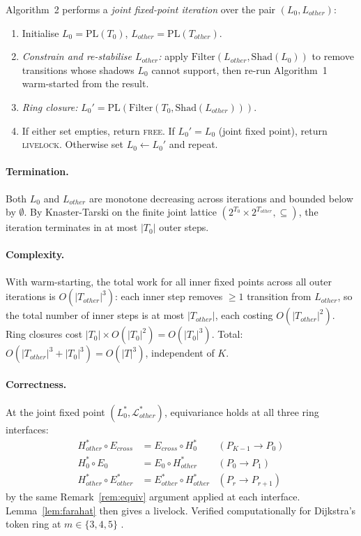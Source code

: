 \documentclass{article}
\newcommand{\Ls}{\mathcal{L}^{*}}
\newcommand{\PL}{\mathrm{PL}}
\newcommand{\Shad}{\mathrm{Shad}}
\newcommand{\Filter}{\mathrm{Filter}}
\newcommand{\Estar}{E^{*}}
\begin{document}
Algorithm~2 performs a \emph{joint fixed-point iteration} over the pair
$(L_0, L_{\mathit{other}})$:
\begin{enumerate}
\item Initialise $L_0 = \PL(T_0)$,
      $L_{\mathit{other}} = \PL(T_{\mathit{other}})$.
\item \emph{Constrain and re-stabilise $L_{\mathit{other}}$:} apply
      $\Filter(L_{\mathit{other}},\Shad(L_0))$ to remove transitions
      whose shadows $L_0$ cannot support, then re-run Algorithm~1
      warm-started from the result.
\item \emph{Ring closure:}
      $L_0' = \PL(\Filter(T_0,\Shad(L_{\mathit{other}})))$.
\item If either set empties, return \textsc{free}.
      If $L_0'=L_0$ (joint fixed point), return \textsc{livelock}.
      Otherwise set $L_0 \leftarrow L_0'$ and repeat.
\end{enumerate}

\paragraph{Termination.}
Both $L_0$ and $L_{\mathit{other}}$ are monotone decreasing across
iterations and bounded below by $\emptyset$.  By Knaster-Tarski on the
finite joint lattice $(2^{T_0}\!\times\!2^{T_{\mathit{other}}},\subseteq)$,
the iteration terminates in at most $|T_0|$ outer steps.

\paragraph{Complexity.}
With warm-starting, the total work for all inner fixed points across
all outer iterations is $O(|T_{\mathit{other}}|^3)$: each inner step
removes $\geq\!1$ transition from $L_{\mathit{other}}$, so the total
number of inner steps is at most $|T_{\mathit{other}}|$, each costing
$O(|T_{\mathit{other}}|^2)$.  Ring closures cost
$|T_0|\times O(|T_0|^2)=O(|T_0|^3)$.  Total:
$O(|T_{\mathit{other}}|^3+|T_0|^3)=O(|T|^3)$, independent of $K$.

\paragraph{Correctness.}
At the joint fixed point $(L_0^*, \Ls_{\mathit{other}})$, equivariance
holds at all three ring interfaces:
\begin{align*}
  H^*_{\mathit{other}}\circ E_{\mathit{cross}}
    &= E_{\mathit{cross}}\circ H_0^*
  & (P_{K-1}\to P_0) \\
  H_0^*\circ E_0
    &= E_0\circ H^*_{\mathit{other}}
  & (P_0 \to P_1) \\
  H^*_{\mathit{other}}\circ\Estar_{\mathit{other}}
    &= \Estar_{\mathit{other}}\circ H^*_{\mathit{other}}
  & (P_r \to P_{r+1})
\end{align*}
by the same Remark~\ref{rem:equiv} argument applied at each interface.
Lemma~\ref{lem:farahat} then gives a livelock.
Verified computationally for Dijkstra's token ring at $m\in\{3,4,5\}$
\citep{farahat2012}.
\end{document}

